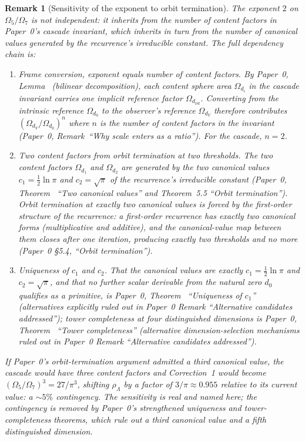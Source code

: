 \documentclass[11pt,a4paper]{article}
\newtheorem{remark}[theorem]{Remark}
\begin{document}
\begin{remark}[Sensitivity of the exponent to orbit termination]\label{rem:sp14-status}
The exponent $2$ on $\Omega_5/\Omega_7$ is not independent: it inherits
from the number of content factors in Paper~0's cascade invariant,
which inherits in turn from the number of canonical values generated
by the recurrence's irreducible constant. The full dependency chain is:
\begin{enumerate}
\item \emph{Frame conversion, exponent equals number of content
factors.} By Paper~0, Lemma~ (bilinear decomposition), each content
sphere area $\Omega_{d_i}$ in the cascade invariant carries one
implicit reference factor $\Omega_{d_{\mathrm{ref}}}$. Converting from
the intrinsic reference $\Omega_{d_0}$ to the observer's reference
$\Omega_{d_V}$ therefore contributes $(\Omega_{d_V}/\Omega_{d_0})^n$
where $n$ is the number of content factors in the invariant
(Paper~0, Remark~``Why scale enters as a ratio''). For the cascade,
$n = 2$.
\item \emph{Two content factors from orbit termination at two
thresholds.} The two content factors $\Omega_{d_1}$ and $\Omega_{d_2}$
are generated by the two canonical values $c_1 = \tfrac{1}{2}\ln\pi$
and $c_2 = \sqrt{\pi}$ of the recurrence's irreducible constant
(Paper~0, Theorem~ ``Two canonical values'' and
Theorem~5.5 ``Orbit termination''). Orbit termination at exactly two
canonical values is forced by the first-order structure of the
recurrence: a first-order recurrence has exactly two canonical
forms (multiplicative and additive), and the canonical-value map
between them closes after one iteration, producing exactly two
thresholds and no more (Paper~0 \S5.4, ``Orbit termination'').
\item \emph{Uniqueness of $c_1$ and $c_2$.} That the canonical values
are exactly $c_1 = \tfrac{1}{2}\ln\pi$ and $c_2 = \sqrt{\pi}$, and
that no further scalar derivable from the natural zero $d_0$ qualifies
as a primitive, is Paper~0, Theorem~ ``Uniqueness of $c_1$''
(alternatives explicitly ruled out in Paper~0 Remark ``Alternative
candidates addressed''); tower completeness at four distinguished
dimensions is Paper~0, Theorem~ ``Tower completeness'' (alternative
dimension-selection mechanisms ruled out in Paper~0 Remark
``Alternative candidates addressed'').
\end{enumerate}
If Paper~0's orbit-termination argument admitted a third canonical
value, the cascade would have three content factors and Correction~1
would become $(\Omega_5/\Omega_7)^3 = 27/\pi^3$, shifting
$\rho_\Lambda$ by a factor of $3/\pi \approx 0.955$ relative to its
current value: a $\sim 5\%$ contingency. The sensitivity is real and
named here; the contingency is removed by Paper~0's strengthened
uniqueness and tower-completeness theorems, which rule out a third
canonical value and a fifth distinguished dimension.
\end{remark}
\end{document}
